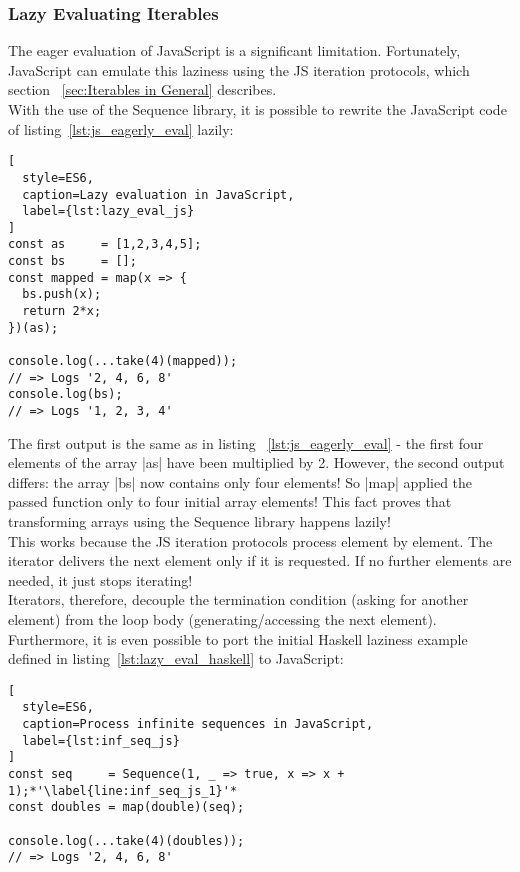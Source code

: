 \subsubsection{Lazy Evaluating Iterables} %
\label{subsub:Lazy Evaluate Iterables}

The eager evaluation of JavaScript is a significant limitation. Fortunately,
JavaScript can emulate this laziness using the JS iteration protocols, which
section ~\ref{sec:Iterables in General} describes. \\ 

With the use of the Sequence library, it is possible to rewrite the JavaScript
code of listing~\ref{lst:js_eagerly_eval} lazily:

\begin{lstlisting}[
  style=ES6,
  caption=Lazy evaluation in JavaScript,
  label={lst:lazy_eval_js}
]
const as     = [1,2,3,4,5];
const bs     = [];
const mapped = map(x => {
  bs.push(x);
  return 2*x;
})(as);

console.log(...take(4)(mapped));
// => Logs '2, 4, 6, 8'
console.log(bs);
// => Logs '1, 2, 3, 4'
\end{lstlisting}
The first output is the same as in listing ~\ref{lst:js_eagerly_eval} - the
first four elements of the array |as| have been multiplied by 2. However, the
second output differs: the array |bs| now contains only four elements! So |map|
applied the passed function only to four initial array elements! This fact
proves that transforming arrays using the Sequence library happens lazily!\\
This works because the JS iteration protocols process element by element. The
iterator delivers the next element only if it is requested. If no further
elements are needed, it just stops iterating! \\
Iterators, therefore, decouple the termination condition (asking for another
element) from the loop body (generating/accessing the next element).\\

Furthermore, it is even possible to port the initial Haskell laziness
example defined in listing~\ref{lst:lazy_eval_haskell} to JavaScript:
\begin{lstlisting}[
  style=ES6,
  caption=Process infinite sequences in JavaScript,
  label={lst:inf_seq_js}
]
const seq     = Sequence(1, _ => true, x => x + 1);*'\label{line:inf_seq_js_1}'*
const doubles = map(double)(seq);

console.log(...take(4)(doubles));
// => Logs '2, 4, 6, 8'
\end{lstlisting}

